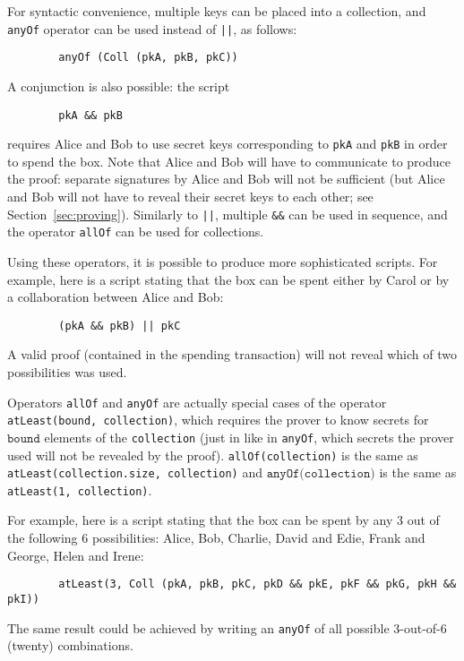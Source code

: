 \documentclass[11pt]{article}
\begin{document}
For syntactic convenience, multiple keys can be placed into a collection, and \texttt{anyOf} operator can be used instead of \texttt{||}, as follows:
\begin{verbatim}
        anyOf (Coll (pkA, pkB, pkC))
\end{verbatim}

A conjunction is also possible: the script
\begin{verbatim}
        pkA && pkB
\end{verbatim}
requires Alice and Bob to use secret keys corresponding to \texttt{pkA} and \texttt{pkB} in order to spend the box. Note that Alice and Bob will have to communicate to produce the proof: separate signatures by Alice and Bob will not be sufficient (but Alice and Bob will not have to reveal their secret keys to each other; see Section~\ref{sec:proving}). Similarly to \texttt{||}, multiple \texttt{\&\&} can be used in sequence, and the operator \texttt{allOf} can be used for collections.


Using these operators, it is possible to produce more sophisticated scripts. For example, here is a script stating that the box can be spent either by Carol or by a collaboration between Alice and Bob:

\begin{verbatim}
        (pkA && pkB) || pkC
\end{verbatim}


A valid proof (contained in the spending transaction) will not reveal which of two possibilities was used.

Operators \texttt{allOf} and \texttt{anyOf} are actually special cases of the operator \texttt{atLeast(bound, collection)}, which requires the prover to know secrets for $\texttt{bound}$ elements of the \texttt{collection} (just in like in \texttt{anyOf}, which secrets the prover used will not be revealed by the proof). \texttt{allOf(collection)} is the same as \texttt{atLeast(collection.size, collection)} and $\texttt{anyOf(collection)}$ is the same as \texttt{atLeast(1, collection)}.

For example, here is a script stating that the box can be spent by any 3 out of the following 6 possibilities: Alice, Bob, Charlie, David and Edie, Frank and George, Helen and Irene:
\begin{verbatim}
        atLeast(3, Coll (pkA, pkB, pkC, pkD && pkE, pkF && pkG, pkH && pkI))
\end{verbatim}
The same result could be achieved by writing an \texttt{anyOf} of all possible 3-out-of-6 (twenty) combinations.
\end{document}
